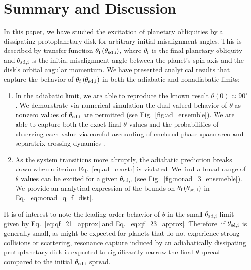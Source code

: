 \documentclass[
        fleqn,
        usenatbib,
    ]{mnras}
\newcommand*{\p}[1]{\left(#1\right)}
\begin{document}
\section{Summary and Discussion}\label{s:disc}

In this paper, we have studied the excitation of planetary obliquities by a
dissipating protoplanetary disk for arbitrary initial misalignment angles. This
is described by transfer function $\theta_{\rm f}\p{\theta_{\rm sd, i}}$, where
$\theta_{\rm f}$ is the final planetary obliquity and $\theta_{\rm sd, i}$ is
the initial misalignment angle between the planet's spin axis and the disk's
orbital angular momentum. We have presented analytical results that capture the
behavior of $\theta_{\rm f}\p{\theta_{\rm sd, i}}$ in both the adiabatic and
nonadiabatic
limits:
\begin{enumerate}
    \item In the adiabatic limit, we are able to reproduce the known result
        $\theta(0) \approx 90^\circ$ \citep{millholland_disk}. We demonstrate
        via numerical simulation the dual-valued behavior of $\theta$ as nonzero
        values of $\theta_{\rm sd, i}$ are permitted (see
        Fig.~\ref{fig:ad_ensemble}). We are able to capture both the exact final
        $\theta$ values and the probabilities of observing each value via
        careful accounting of enclosed phase space area and separatrix crossing
        dynamics \citep{henrard1982,henrard1987}.

    \item As the system transitions more abruptly, the adiabatic prediction
        breaks down when criterion Eq.~\eqref{eq:ad_constr} is violated. We find a
        broad range of $\theta$ values can be excited for a given $\theta_{\rm
        sd, i}$ (see Fig.~\ref{fig:nonad_3_ensemeble}). We provide an analytical
        expression of the bounds on $\theta_{\rm f}\p{\theta_{\rm sd, i}}$ in
        Eq.~\eqref{eq:nonad_q_f_dist}.
\end{enumerate}

It is of interest to note the leading order behavior of $\theta$ in the small
$\theta_{\rm sd, i}$ limit given by Eq.~\eqref{eq:qf_21_approx} and
Eq.~\eqref{eq:qf_23_approx}. Therefore, if $\theta_{\rm sd, i}$ is generally
small, as might be expected for planets that do not experience strong collisions
or scattering, resonance capture induced by an adiabatically dissipating
protoplanetary disk is expected to significantly narrow the final $\theta$
spread compared to the initial $\theta_{\rm sd, i}$ spread.
\end{document}
